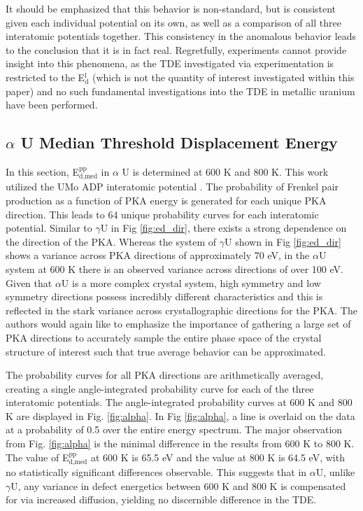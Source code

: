 \documentclass[review]{elsarticle}
\begin{document}
It should be emphasized that this behavior is non-standard, but is consistent given each individual potential on its own, as well as a comparison of all three interatomic potentials together. This consistency in the anomalous behavior leads to the conclusion that it is in fact real. Regretfully, experiments cannot provide insight into this phenomena, as the TDE investigated via experimentation is restricted to the E$^{\textrm{l}}_{\textrm{d}}$ (which is not the quantity of interest investigated within this paper) and no such fundamental investigations into the TDE in metallic uranium have been performed.


\subsection{$\alpha$ U Median Threshold Displacement Energy}

In this section, E$^{\textrm{pp}}_{\textrm{d,med}}$ in $\alpha$ U is determined at 600 K and 800 K. This work utilized the UMo ADP interatomic potential \cite{smirnovaADP}. The probability of Frenkel pair production as a function of PKA energy is generated for each unique PKA direction. This leads to 64 unique probability curves for each interatomic potential. Similar to $\gamma$U in Fig \ref{fig:ed_dir}, there exists a strong dependence on the direction of the PKA. Whereas the system of $\gamma$U shown in Fig \ref{fig:ed_dir} shows a variance across PKA directions of approximately 70 eV, in the $\alpha$U system at 600 K there is an observed variance across directions of over 100 eV. Given that $\alpha$U is a more complex crystal system, high symmetry and low symmetry directions possess incredibly different characteristics and this is reflected in the stark variance across crystallographic directions for the PKA. The authors would again like to emphasize the importance of gathering a large set of PKA directions to accurately sample the entire phase space of the crystal structure of interest such that true average behavior can be approximated. 

The probability curves for all PKA directions are arithmetically averaged, creating a single angle-integrated probability curve for each of the three interatomic potentials. The angle-integrated probability curves at 600 K and 800 K are displayed in Fig. \ref{fig:alpha}. In Fig \ref{fig:alpha}, a line is overlaid on the data at a probability of 0.5 over the entire energy spectrum. The major observation from Fig. \ref{fig:alpha} is the minimal difference in the results from 600 K to 800 K. The value of E$^{\textrm{pp}}_{\textrm{d,med}}$ at 600 K is 65.5 eV and the value at 800 K is 64.5 eV, with no statistically significant differences observable. This suggests that in $\alpha$U, unlike $\gamma$U, any variance in defect energetics between 600 K and 800 K is compensated for via increased diffusion, yielding no discernible difference in the TDE.
\end{document}
